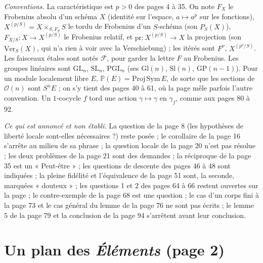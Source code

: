 \documentclass[11pt,a4paper]{article}
\begin{document}
\emph{Conventions.} La caractéristique est $p > 0$ des pages 4 à 35. On note
$F_X$ le Frobenius absolu d'un schéma $X$ (identité sur l'espace, $a \mapsto
a^{p}$ sur les fonctions), $X^{(p/S)} = X \times_{S, F_S} S$ le tordu de
Frobenius d'un $S$-schéma (son $P_S(X)$), $F_{X/S} : X \to X^{(p/S)}$ le
Frobenius relatif, et $\mathrm{pr} : X^{(p/S)} \to X$ la projection (son
$\mathrm{Ver}_S(X)$, qui n'a rien à voir avec la Verschiebung) ; les itérés
sont $F^{\nu}$, $X^{(p^{\nu}/S)}$. Les faisceaux étales sont notés
$\mathcal{F}$, pour garder la lettre $F$ au Frobenius. Les groupes linéaires
sont $\mathrm{GL}_n$, $\mathrm{SL}_n$, $\mathrm{PGL}_n$ (ses $\mathrm{Gl}(n)$,
$\mathrm{Sl}(n)$, $\mathrm{GP}(n-1)$). Pour un module localement libre $E$,
$\mathbb{P}(E) = \mathrm{Proj}\,\mathrm{Sym}\,E$, de sorte que les sections
de $\mathcal{O}(n)$ sont $S^{n}E$ ; on s'y tient des pages 40 à 61, où la
page mêle parfois l'autre convention. Un $1$-cocycle $f$ tord une action
$\gamma \mapsto \gamma$ en $\gamma_f$, comme aux pages 80 à 92.

\emph{Ce qui est annoncé et non établi.} La question de la page 8 (les
hypothèses de liberté locale sont-elles nécessaires ?) reste posée ; le
corollaire de la page 16 s'arrête au milieu de sa phrase ; la question locale
de la page 20 n'est pas résolue ; les deux problèmes de la page 21 sont des
demandes ; la réciproque de la page 35 est un « Peut-être » ; les questions
de descente des pages 46 à 48 sont indiquées ; la pleine fidélité et
l'équivalence de la page 51 sont, la seconde, marquées « douteux » ; les
questions 1 et 2 des pages 64 à 66 restent ouvertes sur la page ; le
contre-exemple de la page 68 est une question ; le cas d'un corps fini à la
page 73 et le cas général du lemme de la page 76 ne sont pas écrits ; le
lemme 5 de la page 79 et la conclusion de la page 94 s'arrêtent avant leur
conclusion.

\section*{Un plan des \emph{Éléments} (page 2)}
\end{document}
